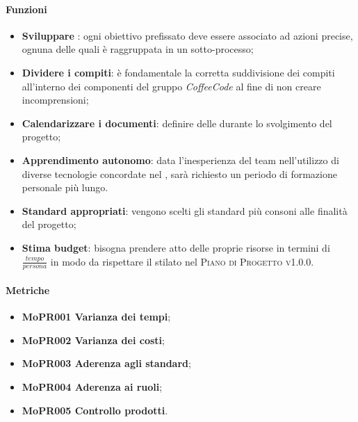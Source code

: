 \documentclass[../piano-di-qualifica.tex]{subfiles}
\begin{document}
\paragraph{Funzioni}
\label{sub:funzioni_1}

\begin{itemize}
    \item \textbf{Sviluppare }: ogni obiettivo prefissato deve essere associato ad azioni precise, ognuna delle quali è raggruppata in un sotto-processo;
    \item \textbf{Dividere i compiti}: è fondamentale la corretta suddivisione dei compiti all'interno dei componenti del gruppo \emph{CoffeeCode} al fine di non creare incomprensioni;
    \item \textbf{Calendarizzare i documenti}: definire delle  durante lo svolgimento del progetto;
    \item \textbf{Apprendimento autonomo}: data l'inesperienza del team nell'utilizzo di diverse tecnologie concordate nel , sarà richiesto un periodo di formazione personale più lungo.
    \item \textbf{Standard appropriati}: vengono scelti gli standard più consoni alle finalità del progetto;
    \item \textbf{Stima budget}: bisogna prendere atto delle proprie risorse in termini di $\frac{tempo}{persona}$ in modo da rispettare il  stilato nel \textsc{Piano di Progetto v1.0.0}.
\end{itemize}

\paragraph{Metriche}
\label{sub:metriche_1}
\begin{itemize}
    \item \textbf{MoPR001 Varianza dei tempi};
    \item \textbf{MoPR002 Varianza dei costi};
    \item \textbf{MoPR003 Aderenza agli standard};
    \item \textbf{MoPR004 Aderenza ai ruoli};
    \item \textbf{MoPR005 Controllo prodotti}.
\end{itemize}
\end{document}
